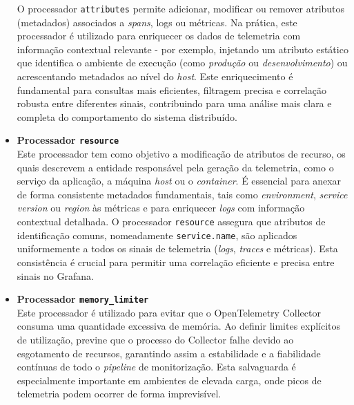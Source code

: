 \begin{itemize}
O processador \texttt{attributes} permite adicionar, modificar ou remover atributos (metadados) associados a \textit{spans}, logs ou métricas. Na prática, este processador é utilizado para enriquecer os dados de telemetria com informação contextual relevante - por exemplo, injetando um atributo estático que identifica o ambiente de execução (como \textit{produção} ou \textit{desenvolvimento}) ou acrescentando metadados ao nível do \textit{host}. Este enriquecimento é fundamental para consultas mais eficientes, filtragem precisa e correlação robusta entre diferentes sinais, contribuindo para uma análise mais clara e completa do comportamento do sistema distribuído.

\item \textbf{Processador \texttt{resource}}\\


Este processador tem como objetivo a modificação de atributos de recurso, os quais descrevem a entidade responsável pela geração da telemetria, como o serviço da aplicação, a máquina \textit{host} ou o \textit{container}. É essencial para anexar de forma consistente metadados fundamentais, tais como \textit{environment}, \textit{service version} ou \textit{region} às métricas e para enriquecer \textit{logs} com informação contextual detalhada. O processador \texttt{resource} assegura que atributos de identificação comuns, nomeadamente \texttt{service.name}, são aplicados uniformemente a todos os sinais de telemetria (\textit{logs}, \textit{traces} e métricas). Esta consistência é crucial para permitir uma correlação eficiente e precisa entre sinais no Grafana.

\item \textbf{Processador \texttt{memory\_limiter}}\\

Este processador é utilizado para evitar que o OpenTelemetry Collector consuma uma quantidade excessiva de memória. Ao definir limites explícitos de utilização, previne que o processo do Collector falhe devido ao esgotamento de recursos, garantindo assim a estabilidade e a fiabilidade contínuas de todo o \textit{pipeline} de monitorização. Esta salvaguarda é especialmente importante em ambientes de elevada carga, onde picos de telemetria podem ocorrer de forma imprevisível.



\end{itemize}
